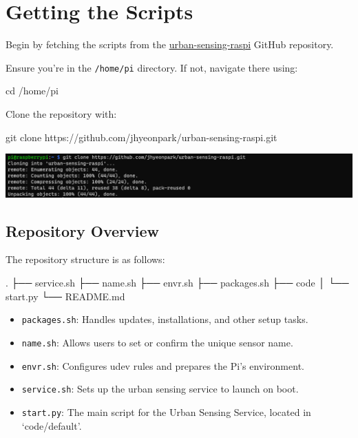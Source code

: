 \documentclass[
  letterpaper,
]{scrbook}
\newenvironment{Shaded}{\begin{snugshade}}{\end{snugshade}}
\newcommand{\BuiltInTok}[1]{\textcolor[rgb]{0.00,0.23,0.31}{#1}}
\newcommand{\ExtensionTok}[1]{\textcolor[rgb]{0.00,0.23,0.31}{#1}}
\newcommand{\FunctionTok}[1]{\textcolor[rgb]{0.28,0.35,0.67}{#1}}
\newcommand{\NormalTok}[1]{\textcolor[rgb]{0.00,0.23,0.31}{#1}}
\providecommand{\tightlist}{%
  \setlength{\itemsep}{0pt}\setlength{\parskip}{0pt}}\usepackage{longtable,booktabs,array}
\begin{document}
\section{Getting the Scripts}\label{getting-the-scripts}

Begin by fetching the scripts from the
\href{https://github.com/jhyeonpark/urban-sensing-raspi}{urban-sensing-raspi}
GitHub repository.

Ensure you're in the \texttt{/home/pi} directory. If not, navigate there
using:

\begin{Shaded}
\begin{Highlighting}[]
\BuiltInTok{cd}\NormalTok{ /home/pi}
\end{Highlighting}
\end{Shaded}

Clone the repository with:

\begin{Shaded}
\begin{Highlighting}[]
\FunctionTok{git}\NormalTok{ clone https://github.com/jhyeonpark/urban{-}sensing{-}raspi.git}
\end{Highlighting}
\end{Shaded}

\includegraphics{content/material/ch2/clone_raspi.png}

\subsection*{Repository Overview}\label{repository-overview}

The repository structure is as follows:

\begin{Shaded}
\begin{Highlighting}[]
\BuiltInTok{.}
\ExtensionTok{├──}\NormalTok{ service.sh}
\ExtensionTok{├──}\NormalTok{ name.sh}
\ExtensionTok{├──}\NormalTok{ envr.sh}
\ExtensionTok{├──}\NormalTok{ packages.sh}
\ExtensionTok{├──}\NormalTok{ code}
\ExtensionTok{│}\NormalTok{   └── start.py}
\ExtensionTok{└──}\NormalTok{ README.md}
\end{Highlighting}
\end{Shaded}

\begin{itemize}
\tightlist
\item
  \texttt{packages.sh}: Handles updates, installations, and other setup
  tasks.
\item
  \texttt{name.sh}: Allows users to set or confirm the unique sensor
  name.
\item
  \texttt{envr.sh}: Configures udev rules and prepares the Pi's
  environment.
\item
  \texttt{service.sh}: Sets up the urban sensing service to launch on
  boot.
\item
  \texttt{start.py}: The main script for the Urban Sensing Service,
  located in `code/default'.
\end{itemize}
\end{document}
